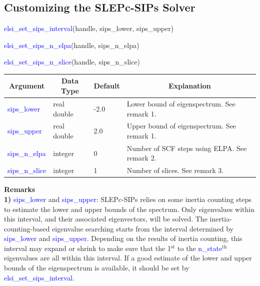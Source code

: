 \documentclass{report}
\begin{document}
\subsection{Customizing the SLEPc-SIPs Solver}
\label{subsec:setter_sips}
\begin{labeling}{\hspace{6cm}}
\item [\hspace{0.3cm} \textcolor{blue}{elsi\_set\_sips\_interval}(handle, sips\_lower, sips\_upper)]
\item [\hspace{0.3cm} \textcolor{blue}{elsi\_set\_sips\_n\_elpa}(handle, sips\_n\_elpa)]
\item [\hspace{0.3cm} \textcolor{blue}{elsi\_set\_sips\_n\_slice}(handle, sips\_n\_slice)]
\end{labeling}

\begin{tabular}[]{|p{30mm}|p{20mm}|p{15mm}|p{100mm}|}
\hline
\multicolumn{1}{|c|}{\textbf{Argument}} & \multicolumn{1}{c|}{\textbf{Data Type}} & \multicolumn{1}{c|}{\textbf{Default}} & \multicolumn{1}{c|}{\textbf{Explanation}}\\
\hline
\textcolor{blue}{sips\_lower}    & real double & -2.0 & Lower bound of eigenspectrum.  See remark 1.\\
\hline
\textcolor{blue}{sips\_upper}    & real double & 2.0  & Upper bound of eigenspectrum.  See remark 1.\\
\hline
\textcolor{blue}{sips\_n\_elpa}  & integer     & 0    & Number of SCF steps using ELPA.  See remark 2.\\
\hline
\textcolor{blue}{sips\_n\_slice} & integer     & 1    & Number of slices.  See remark 3.\\
\hline
\end{tabular}

\bigskip
\textbf{Remarks}\\

\textbf{1)} \textcolor{blue}{sips\_lower} and \textcolor{blue}{sips\_upper}:  SLEPc-SIPs relies on some inertia counting steps to estimate the lower and upper bounds of the spectrum.  Only eigenvalues within this interval, and their associated eigenvectors, will be solved.  The inertia-counting-based eigenvalue searching starts from the interval determined by \textcolor{blue}{sips\_lower} and \textcolor{blue}{sips\_upper}.  Depending on the results of inertia counting, this interval may expand or shrink to make sure that the 1$^\text{st}$ to the \textcolor{blue}{n\_state}$^\text{th}$ eigenvalues are all within this interval.  If a good estimate of the lower and upper bounds of the eigenspectrum is available, it should be set by \textcolor{blue}{elsi\_set\_sips\_interval}.\\
\end{document}
